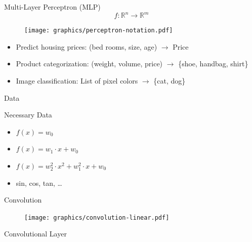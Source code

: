 \documentclass{beamer}
\begin{document}
\begin{frame}{Multi-Layer Perceptron (MLP)}
    $$f: \mathbb{R}^n \rightarrow \mathbb{R}^m$$
    \begin{figure}[ht]
        \centering
        \texttt{[image: graphics/perceptron-notation.pdf]}
    \end{figure}
\end{frame}

\begin{frame}{}
    \begin{itemize}[<+->]
        \item Predict housing prices: (bed rooms, size, age) $\rightarrow$ Price
        \item Product categorization: (weight, volume, price) $\rightarrow$ \{shoe, handbag, shirt\}
        \item Image classification: List of pixel colors $\rightarrow$ \{cat, dog\}
    \end{itemize}
\end{frame}

\begin{frame}{}
    \begin{center}
    \Huge Data
    \end{center}
\end{frame}

\begin{frame}{Necessary Data}
    \begin{itemize}
        \item $f(x) = w_0$
        \item $f(x) = w_1 \cdot x + w_0$
        \item $f(x) = w_2^2 \cdot x^2 + w_1^2 \cdot x + w_0$
        \item sin, cos, tan, \dots
    \end{itemize}
\end{frame}

\begin{frame}{Convolution}
\begin{figure}[ht]
    \centering
    \texttt{[image: graphics/convolution-linear.pdf]}
\end{figure}
\end{frame}

\begin{frame}{Convolutional Layer}
\begin{figure}[ht]
    \centering
    
\end{figure}
\end{frame}
\end{document}
